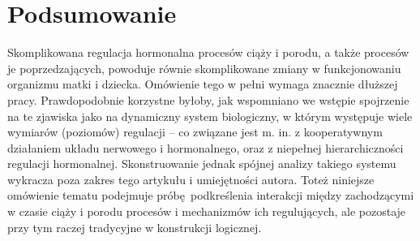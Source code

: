 \documentclass[two column, twoside, a4paper]{article}
\begin{document}
\section{Podsumowanie}

Skomplikowana regulacja hormonalna procesów ciąży i porodu, a także procesów je poprzedzających, powoduje równie skomplikowane zmiany w funkcjonowaniu organizmu matki i dziecka. Omówienie tego w pełni wymaga znacznie dłuższej pracy. Prawdopodobnie korzystne byłoby, jak wspomniano we wstępie spojrzenie na te zjawiska jako na dynamiczny system biologiczny, w którym występuje wiele wymiarów (poziomów) regulacji -- co związane jest m. in. z kooperatywnym działaniem układu nerwowego i hormonalnego, oraz z niepełnej hierarchiczności regulacji hormonalnej. Skonstruowanie jednak spójnej analizy takiego systemu wykracza poza zakres tego artykułu i umiejętności autora. Toteż niniejsze omówienie tematu podejmuje próbę podkreślenia interakcji między zachodzącymi w czasie ciąży i porodu procesów i mechanizmów ich regulujących, ale pozostaje przy tym raczej tradycyjne w konstrukcji logicznej.

\printbibliography
\end{document}
